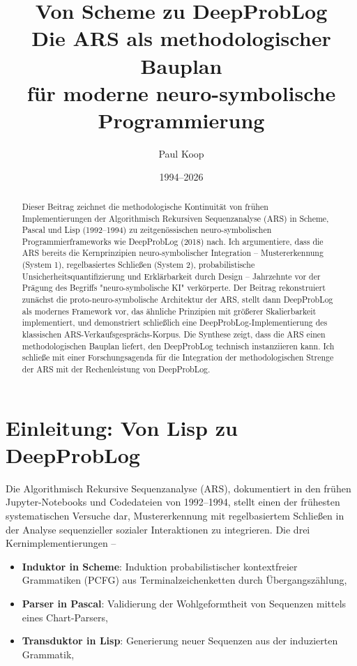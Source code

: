 \documentclass[12pt,a4paper]{article}
\title{\Huge\textbf{Von Scheme zu DeepProbLog} \\[2mm]
       \LARGE Die ARS als methodologischer Bauplan \\[2mm]
       \LARGE für moderne neuro-symbolische Programmierung}
\author{
  \large
  \begin{tabular}{c}
    Paul Koop
  \end{tabular}
}
\date{\large 1994--2026}
\begin{document}
\maketitle

\begin{abstract}
Dieser Beitrag zeichnet die methodologische Kontinuität von frühen Implementierungen 
der Algorithmisch Rekursiven Sequenzanalyse (ARS) in Scheme, Pascal und Lisp 
(1992--1994) zu zeitgenössischen neuro-symbolischen Programmierframeworks wie 
DeepProbLog (2018) nach. Ich argumentiere, dass die ARS bereits die Kernprinzipien 
neuro-symbolischer Integration – Mustererkennung (System 1), regelbasiertes 
Schließen (System 2), probabilistische Unsicherheitsquantifizierung und Erklärbarkeit 
durch Design – Jahrzehnte vor der Prägung des Begriffs "neuro-symbolische KI" 
verkörperte. Der Beitrag rekonstruiert zunächst die proto-neuro-symbolische 
Architektur der ARS, stellt dann DeepProbLog als modernes Framework vor, das 
ähnliche Prinzipien mit größerer Skalierbarkeit implementiert, und demonstriert 
schließlich eine DeepProbLog-Implementierung des klassischen ARS-Verkaufsgesprächs-Korpus. 
Die Synthese zeigt, dass die ARS einen methodologischen Bauplan liefert, den 
DeepProbLog technisch instanziieren kann. Ich schließe mit einer Forschungsagenda 
für die Integration der methodologischen Strenge der ARS mit der Rechenleistung 
von DeepProbLog.
\end{abstract}

\newpage
\tableofcontents
\newpage

\section{Einleitung: Von Lisp zu DeepProbLog}

Die Algorithmisch Rekursive Sequenzanalyse (ARS), dokumentiert in den frühen 
Jupyter-Notebooks und Codedateien von 1992--1994, stellt einen der frühesten 
systematischen Versuche dar, Mustererkennung mit regelbasiertem Schließen in 
der Analyse sequenzieller sozialer Interaktionen zu integrieren. Die drei 
Kernimplementierungen –

\begin{itemize}
    \item \textbf{Induktor in Scheme}: Induktion probabilistischer kontextfreier 
    Grammatiken (PCFG) aus Terminalzeichenketten durch Übergangszählung,
    \item \textbf{Parser in Pascal}: Validierung der Wohlgeformtheit von 
    Sequenzen mittels eines Chart-Parsers,
    \item \textbf{Transduktor in Lisp}: Generierung neuer Sequenzen aus der 
    induzierten Grammatik,
\end{itemize}
\end{document}
